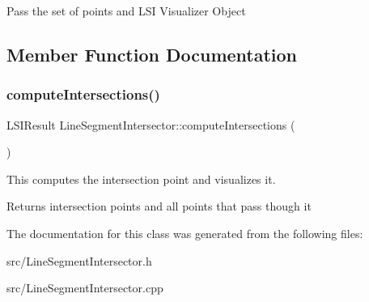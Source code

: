 Pass the set of points and L\+SI Visualizer Object 

\subsection{Member Function Documentation}
\mbox{\label{classLineSegmentIntersector_a261dcce43777e1954e81589ca89529ee}} 
\subsubsection{\texorpdfstring{compute\+Intersections()}{computeIntersections()}}
{\footnotesize\ttfamily L\+S\+I\+Result Line\+Segment\+Intersector\+::compute\+Intersections (\begin{DoxyParamCaption}{ }\end{DoxyParamCaption})}

This computes the intersection point and visualizes it. \begin{DoxyReturn}{Returns}
intersection points and all points that pass though it 
\end{DoxyReturn}


The documentation for this class was generated from the following files\+:\begin{DoxyCompactItemize}
\item 
src/Line\+Segment\+Intersector.\+h\item 
src/Line\+Segment\+Intersector.\+cpp\end{DoxyCompactItemize}
